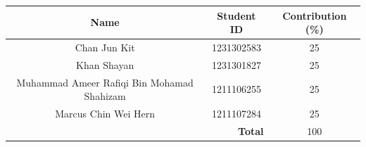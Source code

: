 \documentclass[12pt,a4paper]{article}
\begin{document}
\begin{table}[h]
    \centering
    \begin{tabular}{|c|c|c|}
        \hline
        \textbf{Name} & \textbf{Student ID} & \textbf{Contribution (\%)} \\ \hline
        Chan Jun Kit  & 1231302583 & 25   \\ \hline
        Khan Shayan   & 1231301827 & 25   \\ \hline
        Muhammad Ameer Rafiqi Bin Mohamad Shahizam & 1211106255 & 25  \\ \hline
        Marcus Chin Wei Hern & 1211107284 & 25   \\ \hline
        \multicolumn{2}{|r|}{\textbf{Total}} & 100 \\ \hline
    \end{tabular}
\end{table}
\end{document}
